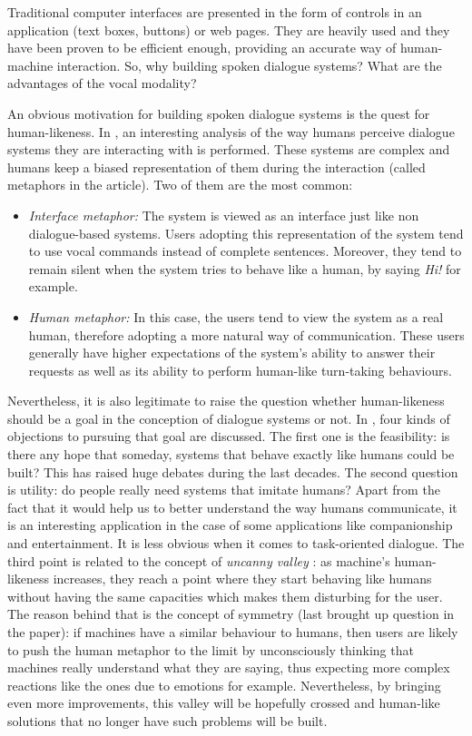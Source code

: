   Traditional computer interfaces are presented in the form of controls in an application (text boxes, buttons) or web pages. They are heavily used and they have been proven to be efficient enough, providing an accurate way of human-machine interaction. So, why building spoken dialogue systems? What are the advantages of the vocal modality?
  
  An obvious motivation for building spoken dialogue systems is the quest for human-likeness. In \cite{Edlund2008}, an interesting analysis of the way humans perceive dialogue systems they are interacting with is performed. These systems are complex and humans keep a biased representation of them during the interaction (called metaphors in the article). Two of them are the most common:
  
  \begin{itemize}
    \item \textit{Interface metaphor:} The system is viewed as an interface just like non dialogue-based systems. Users adopting this representation of the system tend to use vocal commands instead of complete sentences. Moreover, they tend to remain silent when the system tries to behave like a human, by saying \textit{Hi!} for example.
      \item \textit{Human metaphor:} In this case, the users tend to view the system as a real human, therefore adopting a more natural way of communication. These users generally have higher expectations of the system's ability to answer their requests as well as its ability to perform human-like turn-taking behaviours.
        \end{itemize}
        
        Nevertheless, it is also legitimate to raise the question whether human-likeness should be a goal in the conception of dialogue systems or not. In \cite{Edlund2008}, four kinds of objections to pursuing that goal are discussed. The first one is the feasibility: is there any hope that someday, systems that behave exactly like humans could be built? This has raised huge debates during the last decades. The second question is utility: do people really need systems that imitate humans? Apart from the fact that it would help us to better understand the way humans communicate, it is an interesting application in the case of some applications like companionship and entertainment. It is less obvious when it comes to task-oriented dialogue. The third point is related to the concept of \textit{uncanny valley} \cite{Mori1970}: as machine's human-likeness increases, they reach a point where they start behaving like humans without having the same capacities which makes them disturbing for the user. The reason behind that is the concept of symmetry (last brought up question in the paper): if machines have a similar behaviour to humans, then users are likely to push the human metaphor to the limit by unconsciously thinking that machines really understand what they are saying, thus expecting more complex reactions like the ones due to emotions for example. Nevertheless, by bringing even more improvements, this valley will be hopefully crossed and human-like solutions that no longer have such problems will be built.

